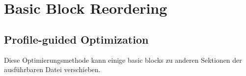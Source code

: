 \section{Basic Block Reordering}


\subsection{Profile-guided Optimization}
\label{PGO}

\myindex{\oracle}

Diese Optimierungsmethode kann einige \gls{basic block}s zu anderen Sektionen der
ausführbaren Datei verschieben.

%
%
%
%
%
%
%
%
%
%
